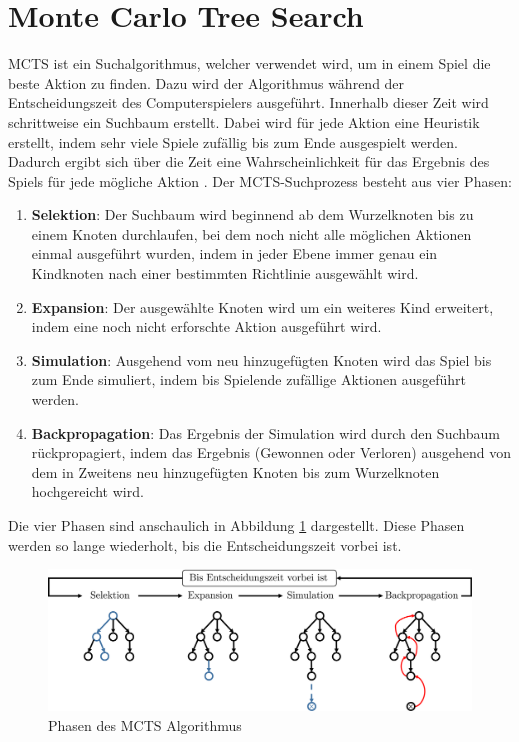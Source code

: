 \section{Monte Carlo Tree Search}
\label{chapter:monte-carlo-tree-search}

\acf{MCTS} ist ein Suchalgorithmus, welcher verwendet wird, um in einem Spiel die beste Aktion zu finden. Dazu wird der Algorithmus während der Entscheidungszeit des Computerspielers ausgeführt. Innerhalb dieser Zeit wird schrittweise ein Suchbaum erstellt. Dabei wird für jede Aktion eine Heuristik erstellt, indem sehr viele Spiele zufällig bis zum Ende ausgespielt werden. Dadurch ergibt sich über die Zeit eine Wahrscheinlichkeit für das Ergebnis des Spiels für jede mögliche Aktion \cite[S. 61]{2008.ParallelMCTS}. Der \ac{MCTS}-Suchprozess besteht aus vier Phasen:

\begin{enumerate}
    \item \textbf{Selektion}: Der Suchbaum wird beginnend ab dem Wurzelknoten bis zu einem Knoten durchlaufen, bei dem noch nicht alle möglichen Aktionen einmal ausgeführt wurden, indem in jeder Ebene immer genau ein Kindknoten nach einer bestimmten Richtlinie ausgewählt wird. \cite[S. 187]{2018.ReinforcementLearning}
    \item \textbf{Expansion}: Der ausgewählte Knoten wird um ein weiteres Kind erweitert, indem eine noch nicht erforschte Aktion ausgeführt wird. \cite[S. 61]{2008.ParallelMCTS}
    \item \textbf{Simulation}: Ausgehend vom neu hinzugefügten Knoten wird das Spiel bis zum Ende simuliert, indem bis Spielende zufällige Aktionen ausgeführt werden. \cite[S. 61]{2008.ParallelMCTS}
    \item \textbf{Backpropagation}: Das Ergebnis der Simulation wird durch den Suchbaum rückpropagiert, indem das Ergebnis (Gewonnen oder Verloren) ausgehend von dem in Zweitens neu hinzugefügten Knoten bis zum Wurzelknoten hochgereicht wird. \cite[S. 187]{2018.ReinforcementLearning}
\end{enumerate}

Die vier Phasen sind anschaulich in Abbildung \ref{fig:mcts-phases} dargestellt. Diese Phasen werden so lange wiederholt, bis die Entscheidungszeit vorbei ist.

\begin{figure}[!ht]
    \centering
    \includegraphics[width=\textwidth]{res/pictures/mcts-phases.pdf}
    \caption{Phasen des \acs{MCTS} Algorithmus}
    \label{fig:mcts-phases}
\end{figure}

